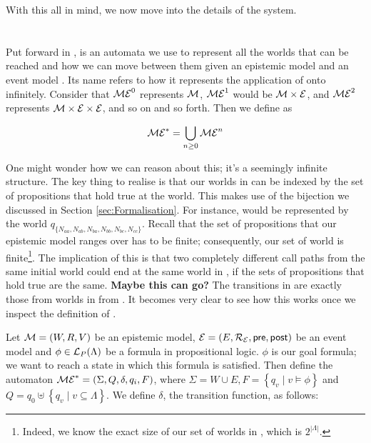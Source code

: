 \documentclass[10pt, a4paper]{report}
\begin{document}
With this all in mind, we now move into the details of the system.

\section{\mestar}
\label{sec:mestar}

Put forward in \cite{AutomataTechniques}, \mestar is an automata we use to
represent all the worlds that can be reached and how we can move between them
given an epistemic model  and an event model . Its name refers to
how it represents the application of  onto  infinitely. Consider
that $\mathcal{ME}^0$ represents $\mathcal{M}$, $\mathcal{ME}^1$ would be $\mathcal{M} \times
\mathcal{E}$, and $\mathcal{ME}^2$ represents $\mathcal{M} \times \mathcal{E} \times \mathcal{E}$, and so
on and so forth. Then we define \mestar as

\begin{equation*}
  \mathcal{ME}^\ast = \bigcup_{n \geq 0} \mathcal{ME}^n
\end{equation*}

One might wonder how we can reason about this; it's a seemingly infinite
structure. The key thing to realise is that our worlds in \mestar can be indexed
by the set of propositions that hold true at the world. This makes use of the
bijection we discussed in Section \ref{sec:Formalisation}. For instance,
 would be represented by the world $q_{\{N_{aa},
  N_{ab}, N_{ba}, N_{bb}, N_{bc}, N_{cc}\}}$. Recall that the set of
propositions that our epistemic model ranges over has to be finite;
consequently, our set of world is finite\footnote{Indeed, we know the exact size
  of our set of worlds in \mestar, which is $2^{|\Lambda|}$.}. The implication
of this is that two completely different call paths from the same initial world
could end at the same world in \mestar, if the sets of propositions that hold
true are the same.
\textbf{Maybe this can go? } The transitions in \mestar are exactly those from worlds in
 from . It becomes very clear to see how this works once we
inspect the definition of \mestar.

Let $\mathcal{M} = (W, R, V)$ be an epistemic model, $\mathcal{E} = (E, \mathcal{R_E}, \textsf{pre},
\textsf{post})$ be an event model and $\phi \in \mathcal{L}_P(\Lambda)$ be a formula in
propositional logic. $\phi$ is our goal formula; we want to reach a state in
which this formula is satisfied. Then define the automaton $\mathcal{ME}^\ast=
(\Sigma, Q, \delta, q_i, F)$, where $\Sigma = W \cup E, F = \left\{ q_v \mid v
  \models \phi \right\}$ and $Q = q_0 \uplus \left\{ q_v \mid v \subseteq
  \Lambda \right\}$. We define $\delta$, the transition function, as follows:
\end{document}
